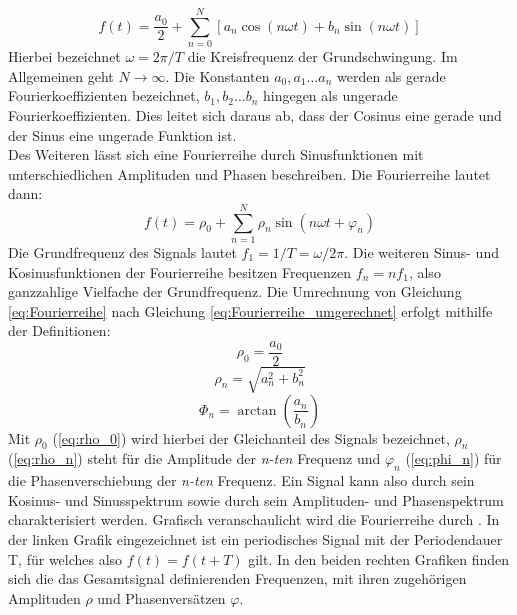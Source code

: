 \begin{equation}
	\label{eq:Fourierreihe}
	f(t) = \dfrac{a_0}{2} + \sum_{n=0}^N[a_n \cos(n \omega t) + b_n \sin(n \omega t)]
\end{equation}
Hierbei bezeichnet $\omega = 2 \pi / T$ die Kreisfrequenz der Grundschwingung. Im Allgemeinen geht $N \to \infty$. Die Konstanten $a_0,a_1 \dots a_n$ werden als gerade Fourierkoeffizienten bezeichnet, $b_1, b_2 \dots b_n$ hingegen als ungerade Fourierkoeffizienten. Dies leitet sich daraus ab, dass der Cosinus eine gerade und der Sinus eine ungerade Funktion ist. \\
Des Weiteren lässt sich eine Fourierreihe durch Sinusfunktionen mit unterschiedlichen Amplituden und Phasen beschreiben. Die Fourierreihe lautet dann:
\begin{equation}
	\label{eq:Fourierreihe_umgerechnet}
	f(t) = \rho_0 + \sum_{n=1}^{N} \rho_n \sin(n \omega t + \varphi_n)
\end{equation}
Die Grundfrequenz des Signals lautet $f_1 = 1/ T = \omega / 2 \pi$. Die weiteren Sinus- und Kosinusfunktionen der Fourierreihe besitzen Frequenzen $f_n = nf_1$, also ganzzahlige Vielfache der Grundfrequenz. Die Umrechnung von Gleichung \ref{eq:Fourierreihe} nach Gleichung \ref{eq:Fourierreihe_umgerechnet} erfolgt mithilfe der Definitionen:
\begin{equation}
	\label{eq:rho_0}
	\rho_0 = \frac{a_0}{2}
\end{equation}
\begin{equation}
	\label{eq:rho_n}
	\rho_n = \sqrt{a_n^2 + b_n^2}
\end{equation}
\begin{equation}
	\label{eq:phi_n}
	\Phi_n = \arctan(\frac{a_n}{b_n})
\end{equation}
Mit $\rho_0$ (\ref{eq:rho_0}) wird hierbei der Gleichanteil des Signals bezeichnet, $\rho_n$ (\ref{eq:rho_n}) steht für die Amplitude der \textit{n-ten} Frequenz und $\varphi_n$ (\ref{eq:phi_n}) für die Phasenverschiebung der \textit{n-ten} Frequenz. Ein Signal kann also durch sein Kosinus- und Sinusspektrum sowie durch sein Amplituden- und Phasenspektrum charakterisiert werden. 
Grafisch veranschaulicht wird die Fourierreihe durch . In der linken Grafik eingezeichnet ist ein periodisches Signal mit der Periodendauer T, für welches also $f(t) = f(t+T)$ gilt. In den beiden rechten Grafiken finden sich die das Gesamtsignal definierenden Frequenzen, mit ihren zugehörigen Amplituden $\rho$ und Phasenversätzen $\varphi$.
